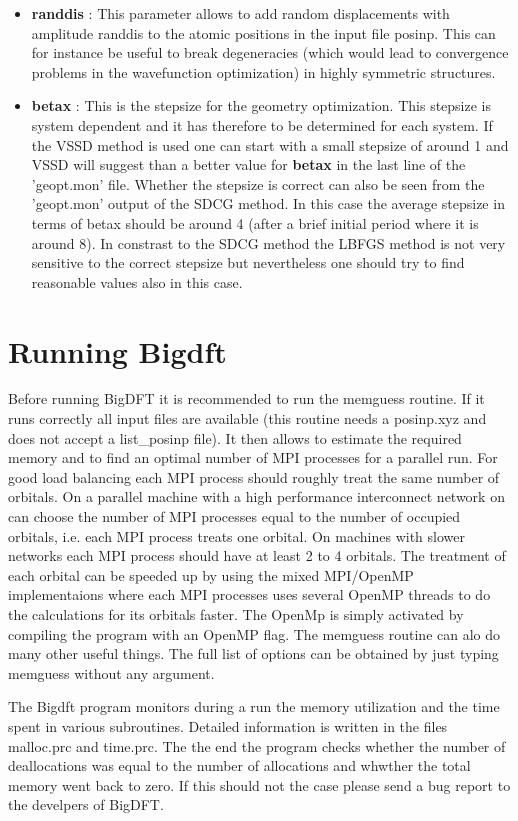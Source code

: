 \documentclass[a4paper,11pt]{report}
\begin{document}
\begin{itemize}
\item  {\bf randdis } : This parameter allows to add random displacements with amplitude randdis to the atomic positions in the 
                        input file posinp. This can for instance be useful to break degeneracies (which would lead to 
                        convergence problems in the wavefunction optimization) in highly symmetric structures.
\item  {\bf betax } : This is the stepsize for the geometry optimization. This stepsize is system dependent and it has therefore to be 
                      determined for each system. If the VSSD method is used one can start with a small stepsize of around 1 and 
                      VSSD will suggest than a better value for {\bf betax } in the last line of the 'geopt.mon' file. 
                      Whether the stepsize is correct can also be seen from the 'geopt.mon' output of the SDCG method. In this 
                      case the average stepsize in terms of betax should be around 4 (after a brief initial period where it is around 8).
                      In constrast to the SDCG method the LBFGS method is not very sensitive to the correct stepsize but nevertheless 
                      one should try to find reasonable values also in this case.
\end{itemize}


\chapter{ \bf Running Bigdft}

\noindent
Before running BigDFT it is recommended to run the memguess routine. If it runs correctly all input files are available 
(this routine needs a posinp.xyz and does not accept a list\_posinp file). It then allows to estimate the required memory and to 
find an optimal number of MPI processes for a parallel run. For good load balancing each MPI process should roughly treat the same number 
of orbitals. On a parallel machine with a high performance interconnect network on can choose the number of MPI processes equal 
to the number of occupied orbitals, i.e. each MPI process treats one orbital. On machines with slower networks each MPI process should 
have at least 2 to 4 orbitals. The treatment of each orbital can be speeded up by using the mixed MPI/OpenMP implementaions 
where each MPI processes uses several OpenMP threads to do the calculations for its orbitals faster. 
The OpenMp is simply activated by compiling the program with an OpenMP flag. 
The memguess routine can alo do many other useful things. The full list of options can be obtained by just typing memguess without any argument. 

The Bigdft program monitors during a run the memory utilization and the time spent in various subroutines. Detailed information 
is written in the files malloc.prc and time.prc. The the end the program checks whether the number of deallocations was equal 
to the number of allocations and whwther the total memory went back to zero. If this should not the case please send a bug report 
to the develpers of BigDFT. 
\end{document}
